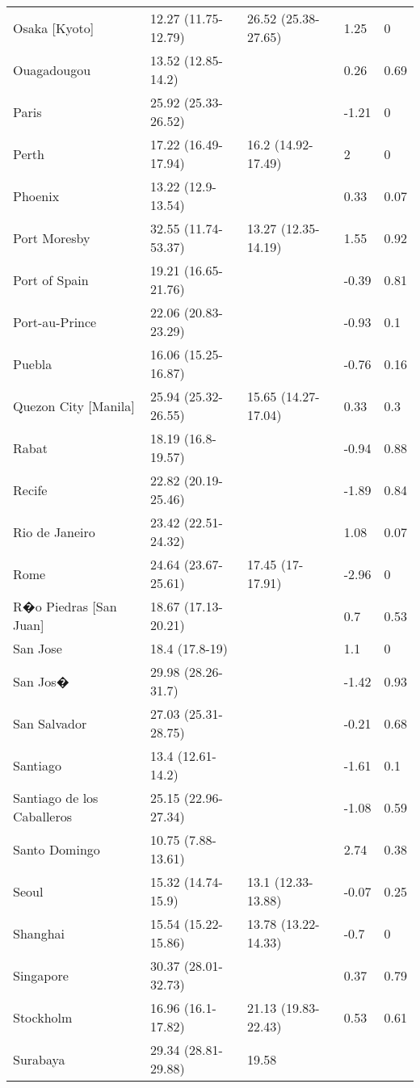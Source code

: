 \begin{longtable}{lllll}
  Osaka [Kyoto] & 12.27
 (11.75-12.79) & 26.52
 (25.38-27.65) & 1.25 & 0 \\ 
  Ouagadougou & 13.52
 (12.85-14.2) &  & 0.26 & 0.69 \\ 
  Paris & 25.92
 (25.33-26.52) &  & -1.21 & 0 \\ 
  Perth & 17.22
 (16.49-17.94) & 16.2
 (14.92-17.49) & 2 & 0 \\ 
  Phoenix & 13.22
 (12.9-13.54) &  & 0.33 & 0.07 \\ 
  Port Moresby & 32.55
 (11.74-53.37) & 13.27
 (12.35-14.19) & 1.55 & 0.92 \\ 
  Port of Spain & 19.21
 (16.65-21.76) &  & -0.39 & 0.81 \\ 
  Port-au-Prince & 22.06
 (20.83-23.29) &  & -0.93 & 0.1 \\ 
  Puebla & 16.06
 (15.25-16.87) &  & -0.76 & 0.16 \\ 
  Quezon City [Manila] & 25.94
 (25.32-26.55) & 15.65
 (14.27-17.04) & 0.33 & 0.3 \\ 
  Rabat & 18.19
 (16.8-19.57) &  & -0.94 & 0.88 \\ 
  Recife & 22.82
 (20.19-25.46) &  & -1.89 & 0.84 \\ 
  Rio de Janeiro & 23.42
 (22.51-24.32) &  & 1.08 & 0.07 \\ 
  Rome & 24.64
 (23.67-25.61) & 17.45
 (17-17.91) & -2.96 & 0 \\ 
  R�o Piedras [San Juan] & 18.67
 (17.13-20.21) &  & 0.7 & 0.53 \\ 
  San Jose & 18.4
 (17.8-19) &  & 1.1 & 0 \\ 
  San Jos� & 29.98
 (28.26-31.7) &  & -1.42 & 0.93 \\ 
  San Salvador & 27.03
 (25.31-28.75) &  & -0.21 & 0.68 \\ 
  Santiago & 13.4
 (12.61-14.2) &  & -1.61 & 0.1 \\ 
  Santiago de los Caballeros & 25.15
 (22.96-27.34) &  & -1.08 & 0.59 \\ 
  Santo Domingo & 10.75
 (7.88-13.61) &  & 2.74 & 0.38 \\ 
  Seoul & 15.32
 (14.74-15.9) & 13.1
 (12.33-13.88) & -0.07 & 0.25 \\ 
  Shanghai & 15.54
 (15.22-15.86) & 13.78
 (13.22-14.33) & -0.7 & 0 \\ 
  Singapore & 30.37
 (28.01-32.73) &  & 0.37 & 0.79 \\ 
  Stockholm & 16.96
 (16.1-17.82) & 21.13
 (19.83-22.43) & 0.53 & 0.61 \\ 
  Surabaya & 29.34
 (28.81-29.88) & 19.58

\end{longtable}
